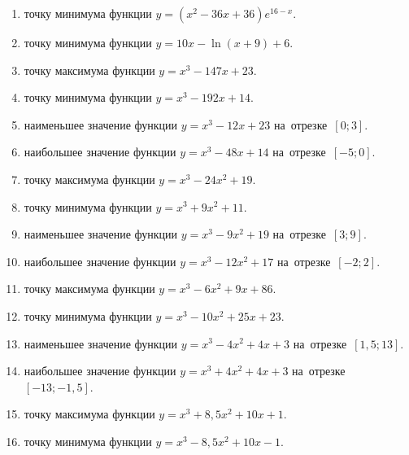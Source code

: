 \documentclass[a4paper,10pt]{article}
\begin{document}
\begin{enumerate}
\item {} точку минимума функции $y=\left(x^2-36x+36\right){{e}^{16-x}}$.

\item {} точку минимума функции $y=10x-\ln \left(x+9\right)+6$.

\item {} точку максимума функции $y=x^3 -147x +23$.

\item {} точку минимума функции $y=x^3 -192x+14$.

\item {} наименьшее значение функции $y=x^3 -12x+23$ на~отрезке~$\left[0;3\right]$.

\item {} наибольшее значение функции $y=x^3 -48x+14$ на~отрезке~$\left[-5;0\right]$.

\item {} точку максимума функции $y=x^3 -24x^2+19$.

\item {} точку минимума функции $y=x^3 +9x^2+11$.

\item {} наименьшее значение функции $y=x^3 -9x^2+19$ на~отрезке~$\left[3;9\right]$.

\item {} наибольшее значение функции $y=x^3 -12x^2+17$ на~отрезке~$\left[-2;2\right]$.

\item {} точку максимума функции $y=x^3 -6x^2+9x+86$.

\item {} точку минимума функции $y=x^3 -10x^2+25x+23$.

\item {} наименьшее значение функции $y=x^3 -4x^2+4x+3$ на~отрезке~$\left[1,5;13\right]$.

\item {} наибольшее значение функции $y=x^3 +4x^2+4x+3$ на~отрезке~$\left[-13;-1,5\right]$.

\item {} точку максимума функции $y=x^3 +8,5x^2+10x+1$.

\item {} точку минимума функции $y=x^3 -8,5x^2+10x-1$.


\end{enumerate}
\end{document}
